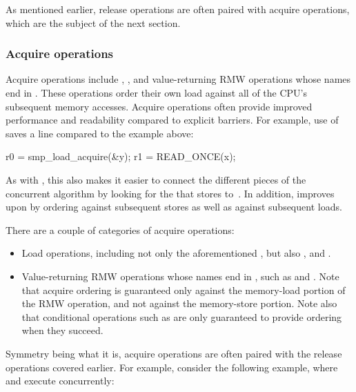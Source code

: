 As mentioned earlier, release operations are often paired with acquire
operations, which are the subject of the next section.


\subsubsection{Acquire operations}
\label{sec:docs:ordering:Acquire operations}

Acquire operations include , ,
and value-returning RMW operations whose names end in .
These operations order their own load against all of the CPU's subsequent
memory accesses.
Acquire operations often provide improved performance and readability
compared to explicit barriers.
For example, use of  saves a line compared to the
 example above:

\begin{VerbatimU}
	r0 = smp_load_acquire(&y);
	r1 = READ_ONCE(x);
\end{VerbatimU}

As with , this also makes it easier to connect
the different pieces of the concurrent algorithm by looking for the
 that stores to~.
In addition,  improves upon  by
ordering against subsequent stores as well as against subsequent loads.

There are a couple of categories of acquire operations:

\begin{itemize}
 \item	Load operations, including not only the aforementioned
	, but also , and
	.

 \item	Value-returning RMW operations whose names end in ,
	such as  and .
	Note that acquire ordering is guaranteed only against the
	memory-load portion of the RMW operation, and not against the
	memory-store portion.
	Note also that conditional operations such as
	 are only guaranteed to provide
	ordering when they succeed.
\end{itemize}

Symmetry being what it is, acquire operations are often paired with the
release operations covered earlier.
For example, consider the following example, where  and
 execute concurrently:

